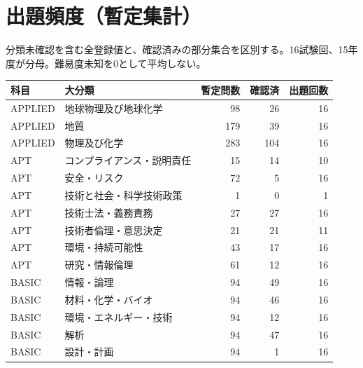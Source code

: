 \chapter{出題頻度（暫定集計）}
分類未確認を含む全登録値と、確認済みの部分集合を区別する。16試験回、15年度が分母。難易度未知を0として平均しない。
\begin{longtable}{p{.16\linewidth}p{.42\linewidth}rrr}
科目 & 大分類 & 暫定問数 & 確認済 & 出題回数\\\hline
APPLIED & 地球物理及び地球化学 & 98 & 26 & 16\\
APPLIED & 地質 & 179 & 39 & 16\\
APPLIED & 物理及び化学 & 283 & 104 & 16\\
APT & コンプライアンス・説明責任 & 15 & 14 & 10\\
APT & 安全・リスク & 72 & 5 & 16\\
APT & 技術と社会・科学技術政策 & 1 & 0 & 1\\
APT & 技術士法・義務責務 & 27 & 27 & 16\\
APT & 技術者倫理・意思決定 & 21 & 21 & 11\\
APT & 環境・持続可能性 & 43 & 17 & 16\\
APT & 研究・情報倫理 & 61 & 12 & 16\\
BASIC & 情報・論理 & 94 & 49 & 16\\
BASIC & 材料・化学・バイオ & 94 & 46 & 16\\
BASIC & 環境・エネルギー・技術 & 94 & 12 & 16\\
BASIC & 解析 & 94 & 47 & 16\\
BASIC & 設計・計画 & 94 & 1 & 16\\
\end{longtable}
